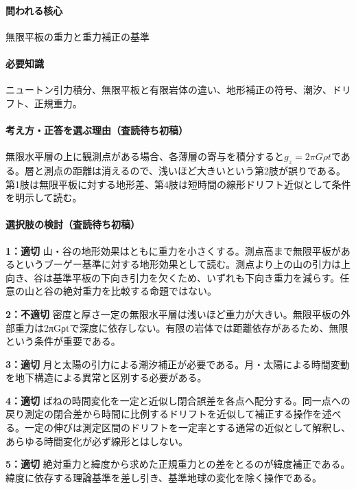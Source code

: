 \paragraph{問われる核心} 無限平板の重力と重力補正の基準

\paragraph{必要知識} ニュートン引力積分、無限平板と有限岩体の違い、地形補正の符号、潮汐、ドリフト、正規重力。

\paragraph{考え方・正答を選ぶ理由（査読待ち初稿）} 無限水平層の上に観測点がある場合、各薄層の寄与を積分すると\(g_z=2\pi G\rho t\)である。層と測点の距離は消えるので、浅いほど大きいという第2肢が誤りである。第1肢は無限平板に対する地形差、第4肢は短時間の線形ドリフト近似として条件を明示して読む。

\paragraph{選択肢の検討（査読待ち初稿）}\mbox{}\par

\noindent\textbf{1：適切} 山・谷の地形効果はともに重力を小さくする。測点高まで無限平板があるというブーゲー基準に対する地形効果として読む。測点より上の山の引力は上向き、谷は基準平板の下向き引力を欠くため、いずれも下向き重力を減らす。任意の山と谷の絶対重力を比較する命題ではない。\par

\noindent\textbf{2：不適切} 密度と厚さ一定の無限水平層は浅いほど重力が大きい。無限平板の外部重力は2πGρtで深度に依存しない。有限の岩体では距離依存があるため、無限という条件が重要である。\par

\noindent\textbf{3：適切} 月と太陽の引力による潮汐補正が必要である。月・太陽による時間変動を地下構造による異常と区別する必要がある。\par

\noindent\textbf{4：適切} ばねの時間変化を一定と近似し閉合誤差を各点へ配分する。同一点への戻り測定の閉合差から時間に比例するドリフトを近似して補正する操作を述べる。一定の伸びは測定区間のドリフトを一定率とする通常の近似として解釈し、あらゆる時間変化が必ず線形とはしない。\par

\noindent\textbf{5：適切} 絶対重力と緯度から求めた正規重力との差をとるのが緯度補正である。緯度に依存する理論基準を差し引き、基準地球の変化を除く操作である。\par

